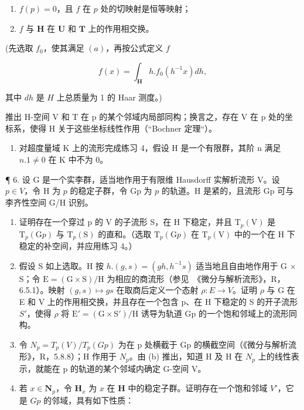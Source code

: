 \begin{enumerate}
\def\labelenumi{(\alph{enumi})}
\item
  \(f(p) = 0\)，且 \(f\) 在 \(p\) 处的切映射是恒等映射；
\item
  \(f\) 与 \(\mathbf{H}\) 在 \(\mathbf{U}\) 和 \(\mathbf{T}\) 上的作用相交换。
\end{enumerate}

(先选取 \(f_0\)，使其满足 \((a)\)，再按公式定义 \(f\)

\[
f (x) = \int_ {\mathbf {H}} h. f _ {0} (h ^ {- 1} x) d h,
\]

其中 \(dh\) 是 \(H\) 上总质量为 1 的 Haar 测度。)

推出 H-空间 V 和 T 在 p 的某个邻域内局部同构；换言之，存在 V 在 p 处的坐标系，使得 H 关于这些坐标线性作用（``Bochner 定理``）。

\begin{enumerate}
\def\labelenumi{\arabic{enumi}.}
\setcounter{enumi}{4}
\tightlist
\item
  对超度量域 K 上的流形完成练习 4，假设 H 是一个有限群，其阶 n 满足 \(n.1 \neq 0\) 在 K 中不为 0。
\end{enumerate}

¶ 6. 设 G 是一个实李群，适当地作用于有限维 Hausdorff 实解析流形 V。设 \(p \in V\)，令 H 为 \(p\) 的稳定子群，令 Gp 为 \(p\) 的轨道。H 是紧的，且流形 Gp 可与李齐性空间 G/H 识别。

\begin{enumerate}
\def\labelenumi{(\alph{enumi})}
\item
  证明存在一个穿过 p 的 V 的子流形 S，在 H 下稳定，并且 \(\mathrm{T}_{p}(\mathrm{V})\) 是 \(\mathrm{T}_{p}(\mathrm{G}p)\) 与 \(\mathrm{T}_{p}(\mathrm{S})\) 的直和。（选取 \(\mathrm{T}_{p}(\mathrm{G}p)\) 在 \(\mathrm{T}_{p}(\mathrm{V})\) 中的一个在 H 下稳定的补空间，并应用练习 4。）
\item
  假设 S 如上选取。H 按 \(h.(g,s)=(gh,h^{-1}s)\) 适当地且自由地作用于 G × S；令 \(\mathrm{E}=(\mathrm{G}\times\mathrm{S})/\mathrm{H}\) 为相应的商流形（参见~《微分与解析流形》，R，6.5.1）。映射 \((g,s)\mapsto gs\) 在取商后定义一个态射 \(\rho:E\to V\)。证明 \(\rho\) 与 G 在 E 和 V 上的作用相交换，并且存在一个包含 p、在 H 下稳定的 S 的开子流形 \(S'\)，使得 \(\rho\) 将 \(\mathrm{E}'=(\mathrm{G}\times\mathrm{S}')/\mathrm{H}\) 诱导为轨道 Gp 的一个饱和邻域上的流形同构。
\item
  令 \(N_{p} = T_{p}(V)/T_{p}(Gp)\) 为在 p 处横截于 Gp 的横截空间（《微分与解析流形》，R，5.8.8）；H 作用于 \(N_{p}\)。由 (b) 推出，知道 H 及 H 在 \(N_{p}\) 上的线性表示，就能在 p 的轨道的某个邻域内确定 G-空间 V。
\item
  若 \(x \in \mathbf{N}_p\)，令 \(\mathbf{H}_x\) 为 \(x\) 在 \(\mathbf{H}\) 中的稳定子群。证明存在一个饱和邻域 \(V'\)，它是 \(Gp\) 的邻域，具有如下性质：
\end{enumerate}

